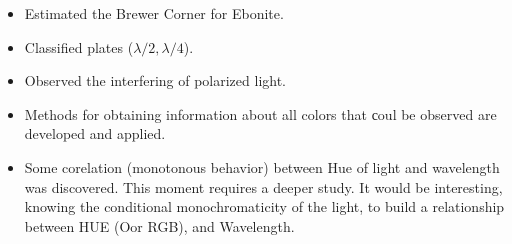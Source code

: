 \begin{itemize}
    \item Estimated the Brewer Corner for Ebonite.
    \item Classified plates ($\lambda/2, \lambda/4$). 
    \item Observed the interfering of polarized light.
    \item Methods for obtaining information about all colors that сoul be observed are developed and applied.
    \item Some corelation (monotonous behavior) between Hue of light and wavelength was discovered. This moment requires a deeper study. It would be interesting, knowing the conditional monochromaticity of the light, to build a relationship between HUE (Oor RGB), and Wavelength.
\end{itemize}